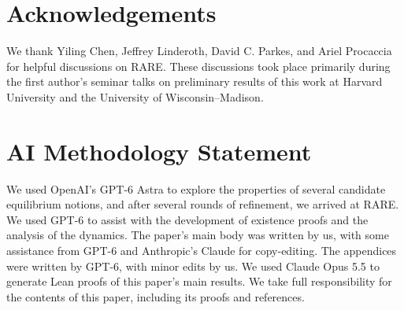 \section*{Acknowledgements}
We thank Yiling Chen, Jeffrey Linderoth, David C. Parkes, and Ariel Procaccia for helpful discussions on RARE.
These discussions took place primarily during the first author’s seminar talks on
preliminary results of this work at Harvard University and the University of Wisconsin–Madison.

\section*{AI Methodology Statement}
We used OpenAI's GPT-6 Astra to explore the properties of several candidate equilibrium notions,
and after several rounds of refinement, we arrived at RARE.
We used GPT-6 to assist with the development of existence proofs and the analysis of the dynamics.
The paper's main body was written by us, with some assistance from GPT-6 and Anthropic's Claude for copy-editing.
The appendices were written by GPT-6, with minor edits by us.
We used Claude Opus 5.5 to generate Lean proofs of this paper's main results.
We take full responsibility for the contents of this paper, including its proofs and references.

